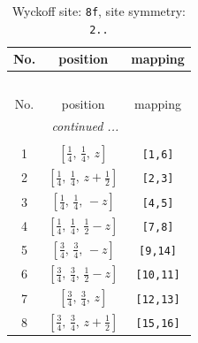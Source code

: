\documentclass[fleqn,8pt]{jsarticle}
\begin{document}
\begin{longtable}{ccc}
\caption{Wyckoff site: {\tt 8f}, site symmetry: {\tt 2..}}
 \\
 \hline \hline
No. & position & mapping \\ \hline \endfirsthead

\multicolumn{2}{l}{\tablename\ \thetable{}} \\
 \hline \hline
No. & position & mapping \\ \hline \endhead

 \hline \hline
\multicolumn{2}{r}{\footnotesize\it continued ...} \\ \endfoot

 \hline \hline
\multicolumn{2}{r}{} \\ \endlastfoot

1 & $\left[ \frac{1}{4},\, \frac{1}{4},\, z \right]$ & {\tt [1,6]} \\ \hline
2 & $\left[ \frac{1}{4},\, \frac{1}{4},\, z + \frac{1}{2} \right]$ & {\tt [2,3]} \\ \hline
3 & $\left[ \frac{1}{4},\, \frac{1}{4},\, - z \right]$ & {\tt [4,5]} \\ \hline
4 & $\left[ \frac{1}{4},\, \frac{1}{4},\, \frac{1}{2} - z \right]$ & {\tt [7,8]} \\ \hline
5 & $\left[ \frac{3}{4},\, \frac{3}{4},\, - z \right]$ & {\tt [9,14]} \\ \hline
6 & $\left[ \frac{3}{4},\, \frac{3}{4},\, \frac{1}{2} - z \right]$ & {\tt [10,11]} \\ \hline
7 & $\left[ \frac{3}{4},\, \frac{3}{4},\, z \right]$ & {\tt [12,13]} \\ \hline
8 & $\left[ \frac{3}{4},\, \frac{3}{4},\, z + \frac{1}{2} \right]$ & {\tt [15,16]} \\
\end{longtable}
\renewcommand{\arraystretch}{1.2}
\end{document}
